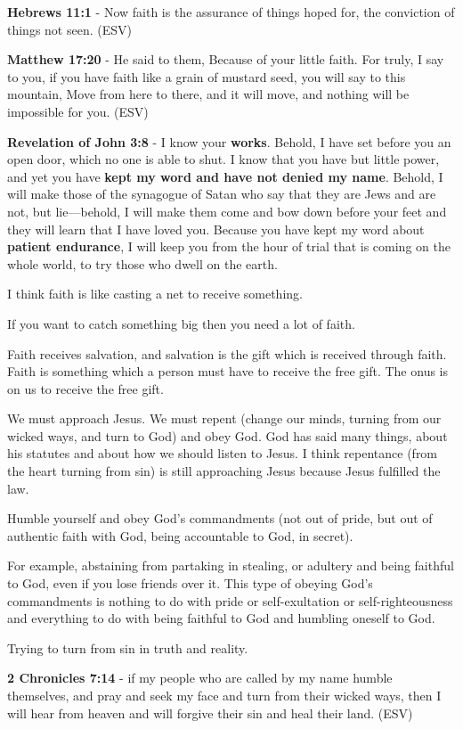 \documentclass[11pt]{article}
\begin{document}
\textbf{Hebrews 11:1} - Now faith is the assurance of things hoped for, the conviction of things not seen. (ESV)

\textbf{Matthew 17:20} - He said to them, Because of your little faith. For truly, I say to you, if you have faith like a grain of mustard seed, you will say to this mountain, Move from here to there, and it will move, and nothing will be impossible for you. (ESV)

\textbf{Revelation of John 3:8} - I know your \textbf{works}. Behold, I have set before you an open door, which no one is able to shut. I know that you have but little power, and yet you have \textbf{kept my word and have not denied my name}.  Behold, I will make those of the synagogue of Satan who say that they are Jews and are not, but lie—behold, I will make them come and bow down before your feet and they will learn that I have loved you.  Because you have kept my word about \textbf{patient endurance}, I will keep you from the hour of trial that is coming on the whole world, to try those who dwell on the earth.

I think faith is like casting a net to receive something.

If you want to catch something big then you need a lot of faith.

Faith receives salvation, and salvation is the gift which is received through faith.
Faith is something which a person must have to receive the free gift.
The onus is on us to receive the free gift.

We must approach Jesus.
We must repent (change our minds, turning from our wicked ways, and turn to God) and obey God.
God has said many things, about his statutes and about how we should listen to Jesus.
I think repentance (from the heart turning from sin) is still approaching Jesus because Jesus fulfilled the law.

Humble yourself and obey God's commandments (not out of pride, but out of authentic faith with God, being accountable to God, in secret).

For example, abstaining from partaking in stealing, or adultery and being faithful to God, even if you lose friends over it.
This type of obeying God's commandments is nothing to do with pride or self-exultation or self-righteousness and everything to do with being faithful to God and humbling oneself to God.

Trying to turn from sin in truth and reality.

\textbf{2 Chronicles 7:14} -  if my people who are called by my name humble themselves, and pray and seek my face and turn from their wicked ways, then I will hear from heaven and will forgive their sin and heal their land.  (ESV)
\end{document}
